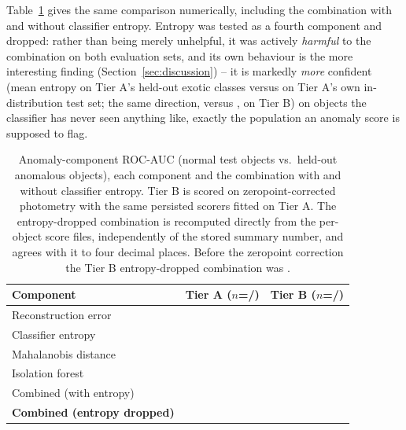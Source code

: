 Table~\ref{tab:anomaly} gives the same comparison numerically, including
the combination with and without classifier entropy. Entropy was tested as
a fourth component and dropped: rather than being merely unhelpful, it was
actively \emph{harmful} to the combination on both evaluation sets, and its
own behaviour is the more interesting finding
(Section~\ref{sec:discussion}) -- it is markedly \emph{more} confident
(mean entropy \EntropyTierAExotic{} on Tier A's held-out exotic classes
versus \EntropyTierANormal{} on Tier A's own in-distribution test set; the
same direction, \EntropyTierBWeird{} versus \EntropyTierBNormal{}, on Tier
B) on objects the classifier has never seen anything like, exactly the
population an anomaly score is supposed to flag.

\begin{table}[htb]
\centering
\caption{Anomaly-component ROC-AUC (normal test objects vs.\ held-out
anomalous objects), each component and the combination with and without
classifier entropy. Tier B is scored on zeropoint-corrected photometry
with the same persisted scorers fitted on Tier A. The entropy-dropped
combination is recomputed directly from the per-object score files,
independently of the stored summary number, and agrees with it to four
decimal places. Before the zeropoint correction the Tier B entropy-dropped
combination was \PreFixAnomalyTierBCombinedThree{}.}
\label{tab:anomaly}
\begin{tabular}{lrr}
\toprule
Component & Tier A ($n$=\AnomalyTierANNormal{}/\AnomalyTierANAnomalous{}) &
  Tier B ($n$=\AnomalyTierBNNormal{}/\AnomalyTierBNAnomalous{}) \\
\midrule
Reconstruction error & \AnomalyTierAReconstructionError{} & \AnomalyTierBReconstructionError{} \\
Classifier entropy & \AnomalyTierAEntropy{} & \AnomalyTierBEntropy{} \\
Mahalanobis distance & \AnomalyTierAMahalanobis{} & \AnomalyTierBMahalanobis{} \\
Isolation forest & \AnomalyTierAIsoforest{} & \AnomalyTierBIsoforest{} \\
Combined (with entropy) & \AnomalyTierACombined{} & \AnomalyTierBCombined{} \\
\textbf{Combined (entropy dropped)} & \textbf{\AnomalyTierACombinedThreeRecomputed{}} & \textbf{\AnomalyTierBCombinedThreeRecomputed{}} \\
\bottomrule
\end{tabular}
\end{table}

